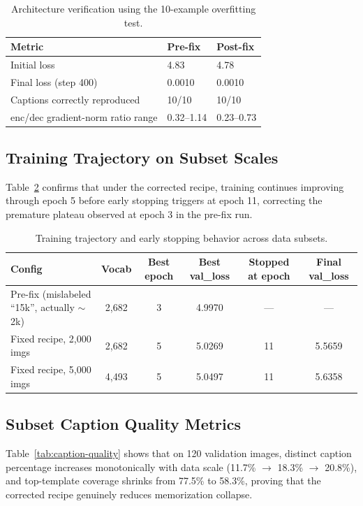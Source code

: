 \documentclass[conference]{IEEEtran}
\begin{document}
\begin{table}[htbp]
\centering
\caption{Architecture verification using the 10-example overfitting test.}
\label{tab:overfit-test}
\small
\renewcommand{\arraystretch}{1.12}
\begin{tabular}{@{}p{}p{}p{}@{}}
\toprule
\textbf{Metric} & \textbf{Pre-fix} & \textbf{Post-fix} \\
\midrule
Initial loss & 4.83 & 4.78 \\
Final loss (step 400) & 0.0010 & 0.0010 \\
Captions correctly reproduced & 10/10 & 10/10 \\
enc/dec gradient-norm ratio range & 0.32--1.14 & 0.23--0.73 \\
\bottomrule
\end{tabular}
\end{table}

\subsection{Training Trajectory on Subset Scales}
\label{sec:results-trajectory}
Table~\ref{tab:training-trajectory} confirms that under the corrected recipe, training continues improving through epoch 5 before early stopping triggers at epoch 11, correcting the premature plateau observed at epoch 3 in the pre-fix run.

\begin{table}[t]
\centering
\caption{Training trajectory and early stopping behavior across data subsets.}
\label{tab:training-trajectory}
\small
\renewcommand{\arraystretch}{1.12}
\begin{tabular}{@{}p{}ccccc@{}}
\toprule
\textbf{Config} & \textbf{Vocab} & \textbf{Best epoch} & \textbf{Best val\_loss} & \textbf{Stopped at epoch} & \textbf{Final val\_loss} \\
\midrule
Pre-fix (mislabeled ``15k'', actually $\sim$2k) & 2,682 & 3 & 4.9970 & --- & --- \\
Fixed recipe, 2,000 imgs & 2,682 & 5 & 5.0269 & 11 & 5.5659 \\
Fixed recipe, 5,000 imgs & 4,493 & 5 & 5.0497 & 11 & 5.6358 \\
\bottomrule
\end{tabular}
\end{table}

\subsection{Subset Caption Quality Metrics}
\label{sec:results-metrics}
Table~\ref{tab:caption-quality} shows that on 120 validation images, distinct caption percentage increases monotonically with data scale (11.7\% $\to$ 18.3\% $\to$ 20.8\%), and top-template coverage shrinks from 77.5\% to 58.3\%, proving that the corrected recipe genuinely reduces memorization collapse.
\end{document}
